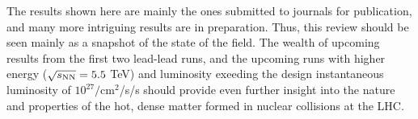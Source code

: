 The results shown here are mainly the ones submitted to journals for publication, and many more
intriguing results are in preparation.  Thus, this review should be seen mainly as a snapshot of
the state of the field.  The wealth of upcoming results from the first two lead-lead runs,
and the upcoming runs with higher energy ($\mbox{$\sqrt{s_{\mathrm{NN}}}$} = 5.5$ TeV) and luminosity 
exeeding the design instantaneous luminosity of $10^{27}/$cm$^2$/s/s should 
provide even further insight into
the nature and properties of the hot, dense matter formed in nuclear collisions at the LHC.
